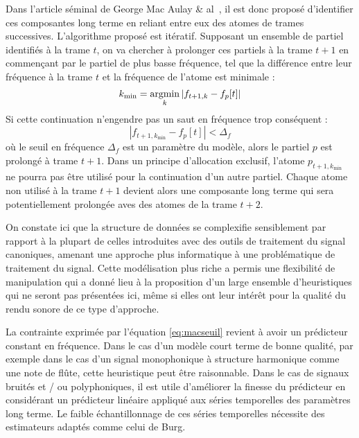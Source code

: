 Dans l'article séminal de George Mac Aulay \& al~\cite{mcaulay}, il est donc proposé \og d'identifier \fg ces composantes long terme en reliant entre eux des atomes de trames successives. L'algorithme proposé est itératif. Supposant un ensemble de partiel identifiés à la trame $t$, on va chercher à prolonger ces partiels à la trame $t+1$ en commençant par le partiel de plus basse fréquence, tel que la différence entre leur fréquence à la trame $t$ et la fréquence de l'atome est minimale :
\begin{equation}
k_{\mathrm{min}} = \operatorname*{argmin}_{k}\left|f_{t+1, k}-f_{p}[t]\right|
\label{eq:mac}
\end{equation}
Si cette continuation n'engendre pas un saut en fréquence trop conséquent :
\begin{equation}
\left|f_{t+1, k_{\mathrm{min}}}-f_{p}[t]\right|<\Delta_{f}
\label{eq:macseuil}
\end{equation}
où le seuil en fréquence $\Delta_{f}$ est un paramètre du modèle, alors le partiel $p$ est prolongé à trame $t+1$. Dans un principe d'allocation exclusif, l'atome $p_{t+1, k_{\mathrm{min}}}$ ne pourra pas être utilisé pour la continuation d'un autre partiel. Chaque atome non utilisé à la trame $t+1$ devient alors une composante long terme qui sera potentiellement prolongée aves des atomes de la trame $t+2$.

On constate ici que la structure de données se complexifie sensiblement par rapport à la plupart de celles introduites avec des outils de traitement du signal canoniques, amenant une approche plus \og informatique \fg à une problématique de traitement du signal. Cette modélisation plus \og riche \fg a permis une flexibilité de manipulation qui a donné lieu à la proposition d'un large ensemble d'heuristiques qui ne seront pas présentées ici, même si elles ont leur intérêt pour la qualité du rendu sonore de ce type d'approche.



La contrainte exprimée par l'équation \ref{eq:macseuil} revient à avoir un prédicteur constant en fréquence. Dans le cas d'un modèle court terme de bonne qualité, par exemple dans le cas d'un signal monophonique à structure harmonique comme une note de flûte, cette heuristique peut être raisonnable. Dans le cas de signaux bruités et / ou polyphoniques, il est utile d'améliorer la finesse du prédicteur en considérant un prédicteur linéaire appliqué aux séries temporelles des paramètres long terme. Le faible échantillonnage de ces séries temporelles nécessite des estimateurs adaptés comme celui de Burg.~\cite{burg1968new}

